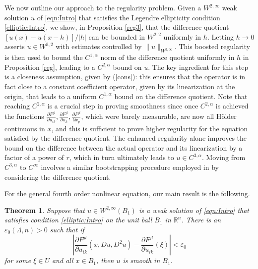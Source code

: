 \documentclass[12pt,leqno]{amsart}%
\newtheorem{theorem}{Theorem}[section]
\theoremstyle{plain}
\numberwithin{equation}{section}
\theoremstyle{definition}
\begin{document}
We now outline our approach to the regularity problem. Given a $W^{2,\infty}$
weak solution $u$ of \eqref{eqn:Intro} that satisfies the Legendre ellipticity
condition \eqref{elliptic:Intro}, we show, in Proposition \ref{reg3}, that the
difference quotient $[u(x)-u(x-h)]/|h|$ can be bounded in $W^{2,2}$ uniformly
in $h$. Letting $h\to0$ asserts $u\in W^{3,2}$ with estimates controlled by
$\|u\|_{W^{2,\infty}}$. This boosted regularity is then used to bound the
$C^{1,\alpha}$ norm of the difference quotient uniformly in $h$ in Proposition
\ref{reg}, leading to a $C^{2,\alpha}$ bound on $u$. The key ingredient for
this step is a closeness assumption, given by (\ref{cons}): this ensures that
the operator is in fact close to a constant coefficient operator, given by its
linearization at the origin, that leads to a uniform $C^{1,\alpha}$ bound on
the difference quotient. Note that reaching $C^{2,\alpha}$ is a crucial step in
proving smoothness since once $C^{2,\alpha}$ is achieved
the functions $\frac{\partial F^{jl}}{\partial u_{ik}},
\frac{\partial F^{jl}}{\partial u_{k}},\frac{\partial F^{jl}}{\partial x_{p}}
$, which were barely measurable, are now all H\"older continuous in $x$, and this 
is sufficient to prove higher regularity for the equation satisfied by the difference quotient. The
enhanced regularity alone improves the bound on the difference between the
actual operator and its linearization by a factor of a power of $r$, which in
turn ultimately leads to $u\in C^{3,\alpha}$. Moving from $C^{3,\alpha}$ to
$C^{\infty}$ involves a similar bootstrapping procedure employed in
\cite{BW1} by considering the difference quotient.

For the general fourth order nonlinear equation, our main result is the following.

\begin{theorem}
\label{main1:Intro} Suppose that $u\in W^{2,\infty}(B_{1})$ is a weak solution
of \eqref{eqn:Intro} that satisfies condition \eqref{elliptic:Intro} on the
unit ball $B_{1}$ in $\mathbb{R}^{n}$. There is an $\varepsilon_{0}%
(\Lambda,n)>0$
such that if
\begin{equation}
\left|  \frac{\partial F^{jl}}{\partial u_{ik}}(x, Du, D^{2}u) -
\frac{\partial F^{jl}}{\partial u_{ik}}(\xi)\right|  <\varepsilon_{0}
\label{cons1}%
\end{equation}
for some $\xi\in U$ and all $x\in B_{1}$, then $u$ is smooth in $B_{1}$.
\end{theorem}
\end{document}
